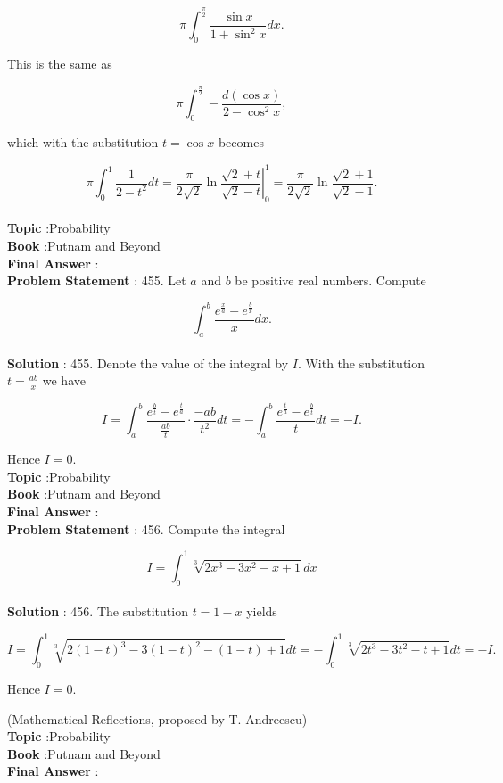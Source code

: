 \documentclass[10pt]{article}
\begin{document}
$$
\pi \int_{0}^{\frac{\pi}{2}} \frac{\sin x}{1+\sin ^{2} x} d x .
$$

This is the same as

$$
\pi \int_{0}^{\frac{\pi}{2}}-\frac{d(\cos x)}{2-\cos ^{2} x},
$$

which with the substitution $t=\cos x$ becomes

$$
\pi \int_{0}^{1} \frac{1}{2-t^{2}} d t=\left.\frac{\pi}{2 \sqrt{2}} \ln \frac{\sqrt{2}+t}{\sqrt{2}-t}\right|_{0} ^{1}=\frac{\pi}{2 \sqrt{2}} \ln \frac{\sqrt{2}+1}{\sqrt{2}-1} .
$$
\\
\textbf{Topic} :Probability\\
\textbf{Book} :Putnam and Beyond\\
\textbf{Final Answer} :\\


\textbf{Problem Statement} :
455. Let $a$ and $b$ be positive real numbers. Compute

$$
\int_{a}^{b} \frac{e^{\frac{x}{a}}-e^{\frac{b}{x}}}{x} d x .
$$
\\
\textbf{Solution} :
455. Denote the value of the integral by $I$. With the substitution $t=\frac{a b}{x}$ we have

$$
I=\int_{a}^{b} \frac{e^{\frac{b}{t}}-e^{\frac{t}{a}}}{\frac{a b}{t}} \cdot \frac{-a b}{t^{2}} d t=-\int_{a}^{b} \frac{e^{\frac{t}{a}}-e^{\frac{b}{t}}}{t} d t=-I .
$$

Hence $I=0$.
\\
\textbf{Topic} :Probability\\
\textbf{Book} :Putnam and Beyond\\
\textbf{Final Answer} :\\


\textbf{Problem Statement} :
456. Compute the integral

$$
I=\int_{0}^{1} \sqrt[3]{2 x^{3}-3 x^{2}-x+1} d x
$$
\\
\textbf{Solution} :
456. The substitution $t=1-x$ yields

$$
I=\int_{0}^{1} \sqrt[3]{2(1-t)^{3}-3(1-t)^{2}-(1-t)+1} d t=-\int_{0}^{1} \sqrt[3]{2 t^{3}-3 t^{2}-t+1} d t=-I .
$$

Hence $I=0$.

(Mathematical Reflections, proposed by T. Andreescu)
\\
\textbf{Topic} :Probability\\
\textbf{Book} :Putnam and Beyond\\
\textbf{Final Answer} :\\
\end{document}
